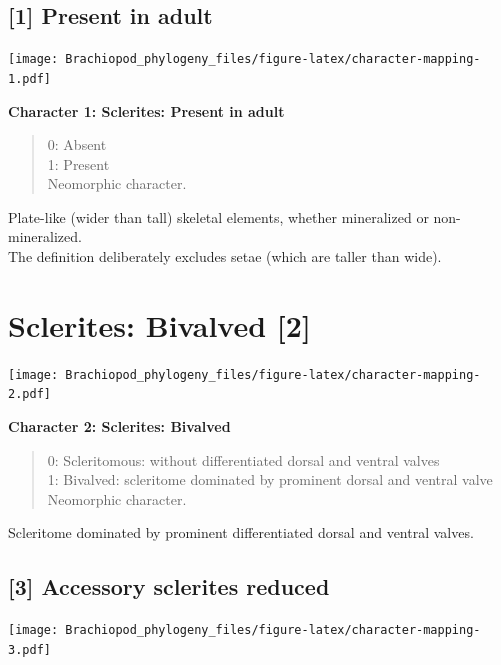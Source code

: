 \documentclass[openany]{book}
\theoremstyle{definition}
\theoremstyle{definition}
\theoremstyle{definition}
\theoremstyle{remark}
\begin{document}
\hypertarget{present-in-adult}{%
\subsection*{{[}1{]} Present in adult}\label{present-in-adult}}

\texttt{[image: Brachiopod\_phylogeny\_files/figure-latex/character-mapping-1.pdf]}

\textbf{Character 1: Sclerites: Present in adult}

\begin{quote}
0: Absent\\
1: Present\\
Neomorphic character.
\end{quote}

Plate-like (wider than tall) skeletal elements, whether mineralized or
non-mineralized.\\
The definition deliberately excludes setae (which are taller than wide).

\hypertarget{sclerites-bivalved-2}{%
\section{Sclerites: Bivalved {[}2{]}}\label{sclerites-bivalved-2}}

\texttt{[image: Brachiopod\_phylogeny\_files/figure-latex/character-mapping-2.pdf]}

\textbf{Character 2: Sclerites: Bivalved}

\begin{quote}
0: Scleritomous: without differentiated dorsal and ventral valves\\
1: Bivalved: scleritome dominated by prominent dorsal and ventral
valve\\
Neomorphic character.
\end{quote}

Scleritome dominated by prominent differentiated dorsal and ventral
valves.

\hypertarget{accessory-sclerites-reduced}{%
\subsection*{{[}3{]} Accessory sclerites
reduced}\label{accessory-sclerites-reduced}}

\texttt{[image: Brachiopod\_phylogeny\_files/figure-latex/character-mapping-3.pdf]}
\end{document}
